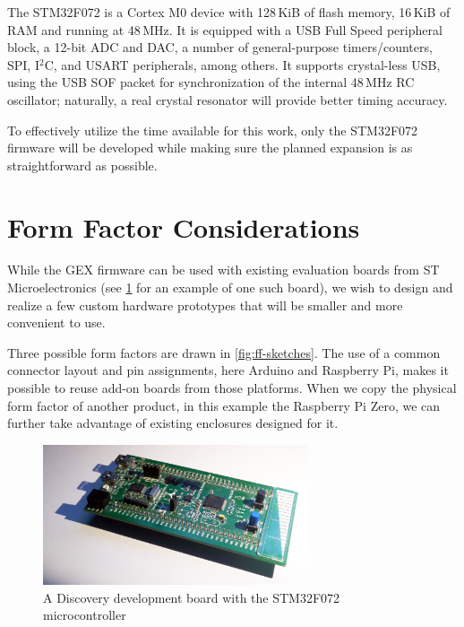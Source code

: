 The STM32F072 is a Cortex M0 device with 128\,KiB of flash memory, 16\,KiB of \gls{RAM} and running at 48\,MHz. It is equipped with a \gls{USB} Full Speed peripheral block, a 12-bit \gls{ADC} and \gls{DAC}, a number of general-purpose timers/counters, SPI, I$^2$C, and USART peripherals, among others. It supports crystal-less \gls{USB}, using the USB SOF packet for synchronization of the internal 48\,MHz RC oscillator; naturally, a real crystal resonator will provide better timing accuracy.

To effectively utilize the time available for this work, only the STM32F072 firmware will be developed while making sure the planned expansion is as straightforward as possible.

\section{Form Factor Considerations} \label{sec:formfactors}

While the GEX firmware can be used with existing evaluation boards from ST Microelectronics (see \cref{fig:discovery} for an example of one such board), we wish to design and realize a few custom hardware prototypes that will be smaller and more convenient to use.

Three possible form factors are drawn in \cref{fig:ff-sketches}. The use of a common connector layout and pin assignments, here Arduino and Raspberry Pi, makes it possible to reuse add-on boards from those platforms. When we copy the physical form factor of another product, in this example the Raspberry Pi Zero, we can further take advantage of existing enclosures designed for it.

\begin{figure}[h]
	\centering
	\includegraphics[width=0.7\textwidth] {img/disco072.jpg}
	\caption[A Discovery board with STM32F072]{\label{fig:discovery}A Discovery development board with the STM32F072 microcontroller}
\end{figure}

